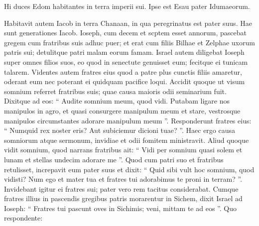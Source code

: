 \begin{biblechapter}
\begin{biblechapter}
\begin{biblechapter}
\begin{biblechapter}
\begin{biblechapter}
\begin{biblechapter}
\begin{biblechapter}
\begin{biblechapter}
\begin{biblechapter}
\begin{biblechapter}
\begin{biblechapter}
\begin{biblechapter}
\begin{biblechapter}
\begin{biblechapter}
\begin{biblechapter}
\begin{biblechapter}
\begin{biblechapter}
\begin{biblechapter}
\begin{biblechapter}
\begin{biblechapter}
\begin{biblechapter}
\begin{biblechapter}
\begin{biblechapter}
\begin{biblechapter}
\begin{biblechapter}
\begin{biblechapter}
\begin{biblechapter}
\begin{biblechapter}
\begin{biblechapter}
\begin{biblechapter}
\begin{biblechapter}
\begin{biblechapter}
\begin{biblechapter}
\begin{biblechapter}
\begin{biblechapter}
\begin{biblechapter}
 Hi duces Edom habitantes in terra imperii sui. Ipse est Esau pater Idumaeorum.
 
\begin{biblechapter}
\verse Habitavit autem Iacob in terra Chanaan, in qua peregrinatus est pater suus. 
\verse Hae sunt generationes Iacob.
 Ioseph, cum decem et scptem esset annorum, pascebat gregem cum fratribus suis adhuc puer; et erat cum filiis Bilhae et Zelphae uxorum patris sui; detulitque patri malam eorum famam. 
\verse Israel autem diligebat Ioseph super omnes filios suos, eo quod in senectute genuisset eum; fecitque ei tunicam talarem. 
\verse Videntes autem fratres eius quod a patre plus cunctis filiis amaretur, oderant eum nec poterant ei quidquam pacifice loqui.
 \verse Accidit quoque ut visum somnium referret fratribus suis; quae causa maioris odii seminarium fuit. 
\verse Dixitque ad eos: “ Audite somnium meum, quod vidi. 
 \verse Putabam ligare nos manipulos in agro, et quasi consurgere manipulum meum et stare, vestrosque manipulos circumstantes adorare manipulum meum ”. 
\verse Responderunt fratres eius: “ Numquid rex noster eris? Aut subiciemur dicioni tuae? ”. Haec ergo causa somniorum atque sermonum, invidiae et odii fomitem ministravit.
 \verse Aliud quoque vidit somnium, quod narrans fratribus ait: “ Vidi per somnium quasi solem et lunam et stellas undecim adorare me ”. 
\verse Quod cum patri suo et fratribus retulisset, increpavit eum pater suus et dixit: “ Quid sibi vult hoc somnium, quod vidisti? Num ego et mater tua et fratres tui adorabimus te proni in terram? ”. 
\verse Invidebant igitur ei fratres sui; pater vero rem tacitus considerabat.
 \verse Cumque fratres illius in pascendis gregibus patris morarentur in Sichem, 
 \verse dixit Israel ad Ioseph: “ Fratres tui pascunt oves in Sichimis; veni, mittam te ad eos ”. Quo respondente: 

\end{biblechapter}
\end{biblechapter}
\end{biblechapter}
\end{biblechapter}
\end{biblechapter}
\end{biblechapter}
\end{biblechapter}
\end{biblechapter}
\end{biblechapter}
\end{biblechapter}
\end{biblechapter}
\end{biblechapter}
\end{biblechapter}
\end{biblechapter}
\end{biblechapter}
\end{biblechapter}
\end{biblechapter}
\end{biblechapter}
\end{biblechapter}
\end{biblechapter}
\end{biblechapter}
\end{biblechapter}
\end{biblechapter}
\end{biblechapter}
\end{biblechapter}
\end{biblechapter}
\end{biblechapter}
\end{biblechapter}
\end{biblechapter}
\end{biblechapter}
\end{biblechapter}
\end{biblechapter}
\end{biblechapter}
\end{biblechapter}
\end{biblechapter}
\end{biblechapter}
\end{biblechapter}
